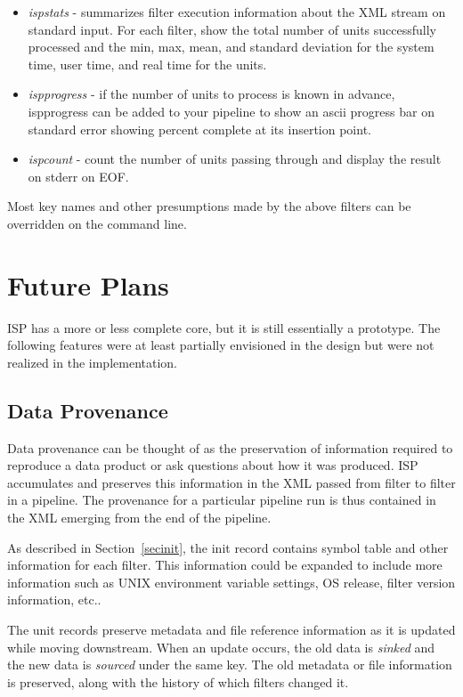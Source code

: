 \documentclass{article}
\begin{document}
\begin{itemize}
\item{{\em ispstats} - summarizes filter execution information about the 
	XML stream on standard input.  
	For each filter, show the total number of units
	successfully processed and the min, max, mean, and standard deviation 
	for the system time, user time, and real time for the units.}

\item{{\em ispprogress} - if the number of units to process is known in 
	advance, ispprogress can be added to your pipeline to show an
	ascii progress bar on standard error showing percent complete
	at its insertion point.}

\item{{\em ispcount} - count the number of units passing through and display
	the result on stderr on EOF.}

\end{itemize}

Most key names and other presumptions made by the above filters can
be overridden on the command line.

\section{Future Plans}\label{secfuture}

ISP has a more or less complete core, but it is still essentially a prototype.  
The following features were at least partially envisioned in the design 
but were not realized in the implementation.

\subsection{Data Provenance}

Data provenance can be thought of as the preservation of information required
to reproduce a data product or ask questions about how it was produced.
ISP accumulates and preserves this information in the XML passed from
filter to filter in a pipeline.  The provenance for a particular pipeline
run is thus contained in the XML emerging from the end of the pipeline.  

As described in Section~\ref{secinit}, the init record contains symbol
table and other information for each filter.  This information
could be expanded to include more information such as UNIX environment
variable settings, OS release, filter version information, etc..

The unit records preserve metadata and file reference information as it is 
updated while moving downstream.  When an update occurs, the old data is
{\em sinked} and the new data is {\em sourced} under the same key.
The old metadata or file information is preserved, along with the history
of which filters changed it.
\end{document}
